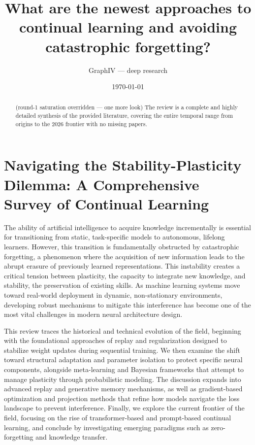 \documentclass[11pt]{article}
\title{What are the newest approaches to continual learning and avoiding catastrophic forgetting?}
\author{GraphIV --- deep research}
\date{\today}
\begin{document}
\maketitle

\begin{abstract}
(round-1 saturation overridden — one more look) The review is a complete and highly detailed synthesis of the provided literature, covering the entire temporal range from origins to the 2026 frontier with no missing papers.
\end{abstract}

\section{Navigating the Stability-Plasticity Dilemma: A Comprehensive Survey of Continual Learning}

The ability of artificial intelligence to acquire knowledge incrementally is essential for transitioning from static, task-specific models to autonomous, lifelong learners. However, this transition is fundamentally obstructed by catastrophic forgetting, a phenomenon where the acquisition of new information leads to the abrupt erasure of previously learned representations. This instability creates a critical tension between plasticity, the capacity to integrate new knowledge, and stability, the preservation of existing skills. As machine learning systems move toward real-world deployment in dynamic, non-stationary environments, developing robust mechanisms to mitigate this interference has become one of the most vital challenges in modern neural architecture design.

This review traces the historical and technical evolution of the field, beginning with the foundational approaches of replay and regularization designed to stabilize weight updates during sequential training. We then examine the shift toward structural adaptation and parameter isolation to protect specific neural components, alongside meta-learning and Bayesian frameworks that attempt to manage plasticity through probabilistic modeling. The discussion expands into advanced replay and generative memory mechanisms, as well as gradient-based optimization and projection methods that refine how models navigate the loss landscape to prevent interference. Finally, we explore the current frontier of the field, focusing on the rise of transformer-based and prompt-based continual learning, and conclude by investigating emerging paradigms such as zero-forgetting and knowledge transfer.
\end{document}
